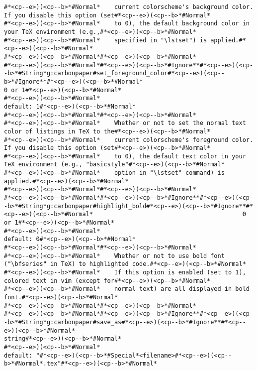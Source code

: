 \begin{lstlisting}[style=carbonpaper]
#*<cp--e>)(<cp--b>*#Normal*    current colorscheme's background color.  If you disable this option (set#*<cp--e>)(<cp--b>*#Normal*
#*<cp--e>)(<cp--b>*#Normal*    to 0), the default background color in your TeX environment (e.g.,#*<cp--e>)(<cp--b>*#Normal*
#*<cp--e>)(<cp--b>*#Normal*    specified in "\lstset") is applied.#*<cp--e>)(<cp--b>*#Normal*
#*<cp--e>)(<cp--b>*#Normal*#*<cp--e>)(<cp--b>*#Normal*
#*<cp--e>)(<cp--b>*#Normal*#*<cp--e>)(<cp--b>*#Ignore**#*<cp--e>)(<cp--b>*#String*g:carbonpaper#set_foreground_color#*<cp--e>)(<cp--b>*#Ignore**#*<cp--e>)(<cp--b>*#Normal*                                    0 or 1#*<cp--e>)(<cp--b>*#Normal*
#*<cp--e>)(<cp--b>*#Normal*                                                                  default: 1#*<cp--e>)(<cp--b>*#Normal*
#*<cp--e>)(<cp--b>*#Normal*#*<cp--e>)(<cp--b>*#Normal*
#*<cp--e>)(<cp--b>*#Normal*    Whether or not to set the normal text color of listings in TeX to the#*<cp--e>)(<cp--b>*#Normal*
#*<cp--e>)(<cp--b>*#Normal*    current colorscheme's foreground color.  If you disable this option (set#*<cp--e>)(<cp--b>*#Normal*
#*<cp--e>)(<cp--b>*#Normal*    to 0), the default text color in your TeX environment (e.g., "basicstyle"#*<cp--e>)(<cp--b>*#Normal*
#*<cp--e>)(<cp--b>*#Normal*    option in "\lstset" command) is applied.#*<cp--e>)(<cp--b>*#Normal*
#*<cp--e>)(<cp--b>*#Normal*#*<cp--e>)(<cp--b>*#Normal*
#*<cp--e>)(<cp--b>*#Normal*#*<cp--e>)(<cp--b>*#Ignore**#*<cp--e>)(<cp--b>*#String*g:carbonpaper#highlight_bold#*<cp--e>)(<cp--b>*#Ignore**#*<cp--e>)(<cp--b>*#Normal*                                          0 or 1#*<cp--e>)(<cp--b>*#Normal*
#*<cp--e>)(<cp--b>*#Normal*                                                                  default: 0#*<cp--e>)(<cp--b>*#Normal*
#*<cp--e>)(<cp--b>*#Normal*#*<cp--e>)(<cp--b>*#Normal*
#*<cp--e>)(<cp--b>*#Normal*    Whether or not to use bold font ("\bfseries" in TeX) to highlighted code.#*<cp--e>)(<cp--b>*#Normal*
#*<cp--e>)(<cp--b>*#Normal*    If this option is enabled (set to 1), colored text in vim (except for#*<cp--e>)(<cp--b>*#Normal*
#*<cp--e>)(<cp--b>*#Normal*    normal text) are all displayed in bold font.#*<cp--e>)(<cp--b>*#Normal*
#*<cp--e>)(<cp--b>*#Normal*#*<cp--e>)(<cp--b>*#Normal*
#*<cp--e>)(<cp--b>*#Normal*#*<cp--e>)(<cp--b>*#Ignore**#*<cp--e>)(<cp--b>*#String*g:carbonpaper#save_as#*<cp--e>)(<cp--b>*#Ignore**#*<cp--e>)(<cp--b>*#Normal*                                                 string#*<cp--e>)(<cp--b>*#Normal*
#*<cp--e>)(<cp--b>*#Normal*                                                   default: "#*<cp--e>)(<cp--b>*#Special*<filename>#*<cp--e>)(<cp--b>*#Normal*.tex"#*<cp--e>)(<cp--b>*#Normal*

\end{lstlisting}
